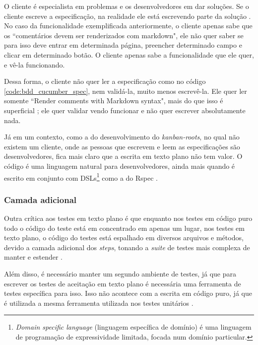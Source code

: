 O cliente é especialista em problemas e os desenvolvedores em dar soluções. Se o cliente escreve a especificação, na realidade ele está escrevendo parte da solução \cite{SteakOverCucumber}. No caso da funcionalidade exemplificada anteriormente, o cliente apenas sabe que os ``comentários devem ser renderizados com markdown", ele não quer saber se para isso deve entrar em determinada página, preencher determinado campo e clicar em determinado botão. O cliente apenas sabe a funcionalidade que ele quer, e vê-la funcionando.

Dessa forma, o cliente não quer ler a especificação como no código \ref{code:bdd_cucumber_spec}, nem validá-la, muito menos escrevê-la. Ele quer ler somente ``Render comments with Markdown syntax", mais do que isso é superficial \cite{WhyBotherWithCucumberTesting}; ele quer validar vendo funcionar e não quer escrever absolutamente nada.

Já em um contexto, como a do desenvolvimento do \textit{kanban-roots}, no qual não existem um cliente, onde as pessoas que escrevem e leem as especificações são desenvolvedores, fica mais claro que a escrita em texto plano não tem valor. O código é uma linguagem natural para desenvolvedores, ainda mais quando é escrito em conjunto com DSLs\footnote{\textit{Domain specific language} (linguagem específica de domínio) é uma linguagem de programação de expressividade limitada, focada num domínio particular.} como a do Rspec \cite{SteakOverCucumber}.



\subsubsection{Camada adicional} %
\label{subsub:camada_adicional}

Outra crítica aos testes em texto plano é que enquanto nos testes em código puro todo o código do teste está em concentrado em apenas um lugar, nos testes em texto plano, o código do testes está espalhado em diversos arquivos e métodos, devido a camada adicional dos \textit{steps}, tonando a \textit{suite} de testes mais complexa de manter e estender \cite{SteakOverCucumber}.

Além disso, é necessário manter um segundo ambiente de testes, já que para escrever os testes de aceitação em texto plano é necessária uma ferramenta de testes específica para isso. Isso não acontece com a escrita em código puro, já que é utilizada a mesma ferramenta utilizada nos testes unitários \cite{WhyBotherWithCucumberTesting}.

